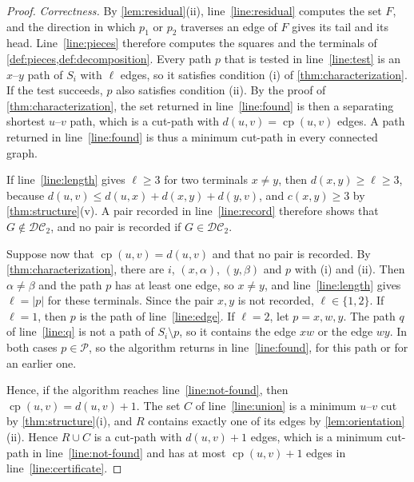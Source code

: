 \documentclass[pdflatex,sn-mathphys-num]{sn-jnl}%
\theoremstyle{thmstyleone}%
\theoremstyle{thmstyletwo}%
\theoremstyle{thmstylethree}%
\newcommand{\cp}{\operatorname{cp}}%
\newcommand{\DC}{\mathcal{DC}_2}%
\begin{document}
\begin{proof}
\emph{Correctness.}
By \cref{lem:residual}(ii), line~\ref{line:residual} computes the set $F$, and the direction in which $p_1$ or $p_2$ traverses an edge of $F$ gives its tail and its head.
Line~\ref{line:pieces} therefore computes the squares and the terminals of \cref{def:pieces,def:decomposition}.
Every path $p$ that is tested in line~\ref{line:test} is an $x$--$y$ path of $S_i$ with $\ell$ edges, so it satisfies condition (i) of \cref{thm:characterization}.
If the test succeeds, $p$ also satisfies condition (ii).
By the proof of \cref{thm:characterization}, the set returned in line~\ref{line:found} is then a separating shortest $u$--$v$ path, which is a cut-path with $d(u, v) = \cp(u, v)$ edges.
A path returned in line~\ref{line:found} is thus a minimum cut-path in every connected graph.

If line~\ref{line:length} gives $\ell \geq 3$ for two terminals $x \neq y$, then $d(x, y) \geq \ell \geq 3$, because $d(u, v) \leq d(u, x) + d(x, y) + d(y, v)$, and $c(x, y) \geq 3$ by \cref{thm:structure}(v).
A pair recorded in line~\ref{line:record} therefore shows that $G \notin \DC$, and no pair is recorded if $G \in \DC$.

Suppose now that $\cp(u, v) = d(u, v)$ and that no pair is recorded.
By \cref{thm:characterization}, there are $i$, $(x, \alpha)$, $(y, \beta)$ and $p$ with (i) and (ii).
Then $\alpha \neq \beta$ and the path $p$ has at least one edge, so $x \neq y$, and line~\ref{line:length} gives $\ell = |p|$ for these terminals.
Since the pair $x, y$ is not recorded, $\ell \in \{1, 2\}$.
If $\ell = 1$, then $p$ is the path of line~\ref{line:edge}.
If $\ell = 2$, let $p = x, w, y$.
The path $q$ of line~\ref{line:q} is not a path of $S_i \setminus p$, so it contains the edge $xw$ or the edge $wy$.
In both cases $p \in \mathcal{P}$, so the algorithm returns in line~\ref{line:found}, for this path or for an earlier one.

Hence, if the algorithm reaches line~\ref{line:not-found}, then $\cp(u, v) = d(u, v) + 1$.
The set $C$ of line~\ref{line:union} is a minimum $u$--$v$ cut by \cref{thm:structure}(i), and $R$ contains exactly one of its edges by \cref{lem:orientation}(ii).
Hence $R \cup C$ is a cut-path with $d(u, v) + 1$ edges, which is a minimum cut-path in line~\ref{line:not-found} and has at most $\cp(u, v) + 1$ edges in line~\ref{line:certificate}.


\end{proof}
\end{document}
